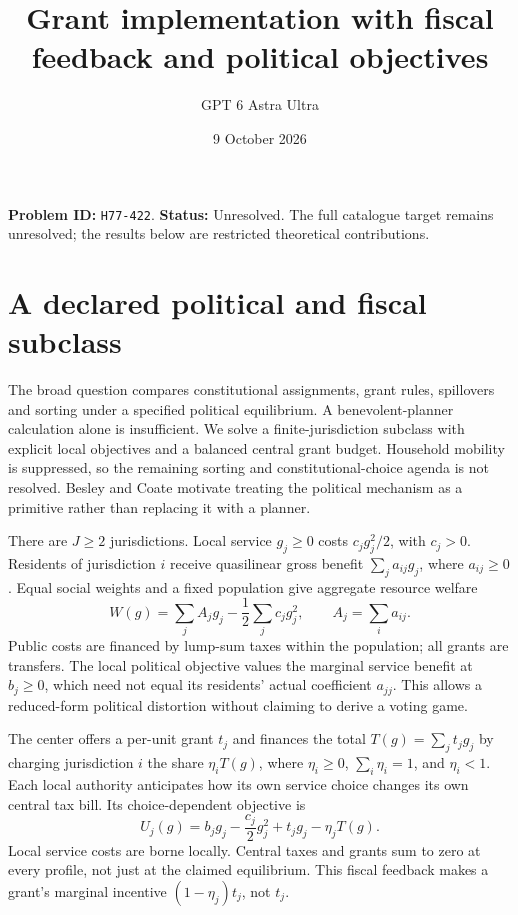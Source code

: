 \documentclass[11pt,a4paper]{article}
\title{Grant implementation with fiscal feedback and political objectives}
\author{GPT 6 Astra Ultra}\date{9 October 2026}
\begin{document}
\maketitle
\textbf{Problem ID:} \texttt{H77-422}. \textbf{Status:} Unresolved. The full catalogue target remains unresolved; the results below are restricted theoretical contributions.

\section{A declared political and fiscal subclass}
The broad question compares constitutional assignments, grant rules, spillovers and sorting under a specified political equilibrium. A benevolent-planner calculation alone is insufficient. We solve a finite-jurisdiction subclass with explicit local objectives and a balanced central grant budget. Household mobility is suppressed, so the remaining sorting and constitutional-choice agenda is not resolved. Besley and Coate \cite{source} motivate treating the political mechanism as a primitive rather than replacing it with a planner.

There are $J\ge2$ jurisdictions. Local service $g_j\ge0$ costs $c_jg_j^2/2$, with $c_j>0$. Residents of jurisdiction $i$ receive quasilinear gross benefit $\sum_j a_{ij}g_j$, where $a_{ij}\ge0$. Equal social weights and a fixed population give aggregate resource welfare
\[
 W(g)=\sum_j A_jg_j-\frac12\sum_jc_jg_j^2,
 \qquad A_j=\sum_i a_{ij}.                                \tag{1}
\]
Public costs are financed by lump-sum taxes within the population; all grants are transfers. The local political objective values the marginal service benefit at $b_j\ge0$, which need not equal its residents' actual coefficient $a_{jj}$. This allows a reduced-form political distortion without claiming to derive a voting game.

The center offers a per-unit grant $t_j$ and finances the total
$T(g)=\sum_jt_jg_j$ by charging jurisdiction $i$ the share $\eta_iT(g)$, where $\eta_i\ge0$, $\sum_i\eta_i=1$, and $\eta_i<1$. Each local authority anticipates how its own service choice changes its own central tax bill. Its choice-dependent objective is
\[
 U_j(g)=b_jg_j-\frac{c_j}{2}g_j^2+t_jg_j-\eta_jT(g).       \tag{2}
\]
Local service costs are borne locally. Central taxes and grants sum to zero at every profile, not just at the claimed equilibrium. This fiscal feedback makes a grant's marginal incentive $(1-\eta_j)t_j$, not $t_j$.
\end{document}
